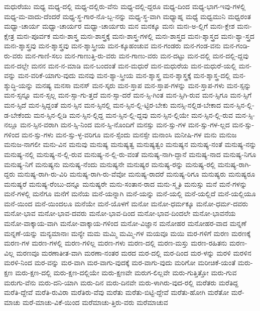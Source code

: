 {ಮಧುರೆಯು
ಮಧ್ಯ
ಮಧ್ಯ-ದಲ್ಲಿ
ಮಧ್ಯ-ದಲ್ಲಿರು-ವೆನು
ಮಧ್ಯ-ದಲ್ಲಿ-ದ್ದರೂ
ಮಧ್ಯ-ದಿಂದ
ಮಧ್ಯ-ಭಾಗ-ಇವು-ಗಳಲ್ಲಿ
ಮಧ್ಯ-ಮ-ವಾದು-ದೆಂದರೆ
ಮಧ್ಯ-ಸ್ಥ-ಗಾರ-ನೊ-ಬ್ಬ-ನನ್ನು
ಮಧ್ಯ-ಸ್ಥ-ವಾಗಿ
ಮಧ್ಯಾಹ್ನ
ಮಧ್ಯೆ
ಮಧ್ವಮುನಿ
ಮಧ್ವರಂತ
ಮಧ್ವಾ-ಚಾರ್ಯ
ಮಧ್ವಾ-ಚಾರ್ಯರ
ಮಧ್ವಾ-ಚಾರ್ಯರು
ಮನ
ಮನಕ್ಕೂ
ಮನಃ
ಮನಃ-ಅ-ಲ್ಲಿಗೆ
ಮನಃ-ಕ್ಲೇಶ
ಮನಃ-ಕ್ಷೇತ್ರ
ಮನಃ-ಪೂರ್ವಕ
ಮನಃ-ಶಾಸ್ತ್ರ
ಮನಃ-ಶಾಸ್ತ್ರಕ್ಕೆ
ಮನಃ-ಶಾಸ್ತ್ರ-ಗಳಲ್ಲಿ
ಮನಃ-ಶಾಸ್ತ್ರದ
ಮನಃ-ಶ್ಶಾಸ್ತ್ರದ
ಮನಃ-ಶ್ಯಾ-ಸ್ತ್ರದ
ಮನಃ-ಶ್ಶಾಸ್ತ್ರವು
ಮನ-ಶ್ಶಾಸ್ತ್ರವು
ಮನ-ಶ್ಶಾಸ್ತ್ರೀಯ
ಮನ-ಕ್ಕೂಹಂಚುವ
ಮನ-ಗಂಡರು
ಮನ-ಗಂಡ-ವನು
ಮನ-ಗಂಡಿ-ರು-ವರು
ಮನ-ಗಾಣಿ-ಸಲು
ಮನ-ಗಾಣುತ್ತಿ-ರು-ವರು
ಮನ-ಗಾಣು-ವರು
ಮನ-ದಟ್ಟು
ಮನ-ದಲ್ಲಿ
ಮನ-ದಲ್ಲಿ-ದ್ದವು
ಮನ-ದಲ್ಲೇ
ಮನನ
ಮನ-ನ-ಮಾಡಿ
ಮನ-ಬಂದಂತೆ
ಮನ-ಮಧುರೆ
ಮನ-ಮಧುರೆಯ
ಮನ-ಮಧುರೆ-ಯಲ್ಲಿ
ಮನ-ವನ್ನು
ಮನ-ವರಿಕೆ-ಯಾಗು-ವುದು
ಮನವು
ಮನ-ಶ್ಯಾ-ಸ್ತ್ರೀಯ
ಮನ-ಶ್ಶಾಸ್ತ್ರ
ಮನ-ಶ್ಶಾಸ್ತ್ರಕ್ಕೆ
ಮನ-ಶ್ಶಾಸ್ತ್ರ-ದಲ್ಲಿ
ಮನ-ಶ್ಶುದ್ಧಿ-ಯನ್ನು
ಮನಷ್ಯ
ಮನಸಾ
ಮನಸ್
ಮನ-ಸ್ಕರು
ಮನ-ಸ್ತಾಪ
ಮನ-ಸ್ತಾಪ-ಗಳನ್ನು
ಮನ-ಸ್ತಾಪ-ಗಳು
ಮನ-ಸ್ಸನ್ನು
ಮನ-ಸ್ಸನ್ನೂ
ಮನ-ಸ್ಸಲ್ಲ
ಮನ-ಸ್ಸಾ-ಗು-ತ್ತದೆ
ಮನ-ಸ್ಸಾ-ದರೆ
ಮನ-ಸ್ಸಿ-ಗಿಂತ
ಮನ-ಸ್ಸಿಗಿ-ರುವ
ಮನ-ಸ್ಸಿಗೂ
ಮನ-ಸ್ಸಿಗೆ
ಮನ-ಸ್ಸಿದೆ
ಮನ-ಸ್ಸಿದ್ದಂತೆ
ಮನ-ಸ್ಸಿನ
ಮನ-ಸ್ಸಿನಲ್ಲಿ
ಮನ-ಸ್ಸಿನ-ಲ್ಲಿ-ಟ್ಟಿರ-ಬೇಕು
ಮನಸ್ಸಿ-ನಲ್ಲಿಡ-ಬೇಕಾದ
ಮನ-ಸ್ಸಿನ-ಲ್ಲಿ-ಡ-ಬೇಕೆಂದು
ಮನ-ಸ್ಸಿನ-ಲ್ಲಿಡಿ
ಮನ-ಸ್ಸಿನ-ಲ್ಲಿದ್ದ
ಮನ-ಸ್ಸಿನ-ಲ್ಲಿ-ದ್ದವು
ಮನ-ಸ್ಸಿನ-ಲ್ಲಿಯೇ
ಮನ-ಸ್ಸಿನ-ಲ್ಲಿ-ರುವ
ಮನ-ಸ್ಸಿ-ನಲ್ಲೂ
ಮನ-ಸ್ಸಿನ-ವರಾಗಿ
ಮನ-ಸ್ಸಿ-ನಿಂದ
ಮನ-ಸ್ಸಿ-ನೊಂದಿಗೆ
ಮನಸ್ಸು
ಮನ-ಸ್ಸು-ಗಳ
ಮನ-ಸ್ಸು-ಗಳ-ಲ್ಲದ
ಮನ-ಸ್ಸು-ಗಳಿಂದ
ಮನ-ಸ್ಸು-ಗಳು
ಮನ-ಸ್ಸು-ಳ್ಳ-ವರಿಗೂ
ಮನ-ಸ್ಸೆಂದು
ಮನಸ್ಸೇ
ಮನಾಂಸಿ
ಮನೀಷಿ-ಗಳ
ಮನು
ಮನುಜ
ಮನುಜ-ನಾಗಲೀ
ಮನು-ವಿನ
ಮನುವು
ಮನುಷ್ಯ
ಮನುಷ್ಯತ್ವ
ಮನುಷ್ಯತ್ವಂ
ಮನುಷ್ಯನ
ಮನುಷ್ಯ-ನಂತೆ
ಮನುಷ್ಯ-ನನ್ನು
ಮನುಷ್ಯ-ನಲ್ಲಿ
ಮನುಷ್ಯ-ನ-ಲ್ಲಿ-ರುವ
ಮನುಷ್ಯ-ನ-ಲ್ಲಿ-ರು-ವಂತೆ
ಮನುಷ್ಯ-ನಾಗಿ-ದ್ದಾನೆ
ಮನುಷ್ಯ-ನಾದ
ಮನುಷ್ಯ-ನಿಗೂ
ಮನುಷ್ಯ-ನಿಗೆ
ಮನುಷ್ಯನು
ಮನುಷ್ಯ-ನೆಂದು
ಮನುಷ್ಯನೇ
ಮನುಷ್ಯರ
ಮನುಷ್ಯ-ರನ್ನು
ಮನುಷ್ಯ-ರಲ್ಲಿ
ಮನುಷ್ಯ-ರಾಗಿ-ದ್ದರು
ಮನುಷ್ಯ-ರಾಗಿ-ರು-ವಿರಿ
ಮನುಷ್ಯ-ರಾಗಿ-ರು-ವೆವೋ
ಮನುಷ್ಯ-ರಾದರೆ
ಮನುಷ್ಯ-ರಿಗೂ
ಮನುಷ್ಯರು
ಮನುಷ್ಯರೂ
ಮನುಷ್ಯರೆ
ಮನುಷ್ಯ-ರೆಂಬು-ದನ್ನೂ
ಮನುಷ್ಯರೇ
ಮನು-ಸಂತಾನ-ರಾದ
ಮನು-ಸ್ಮೃತಿ
ಮನುಸ್ಸು
ಮನೆ
ಮನೆ-ಗಳನ್ನು
ಮನೆ-ಗಳಲ್ಲಿ
ಮನೆಗೂ
ಮನೆಗೆ
ಮನೆಯ
ಮನೆ-ಯನ್ನಾಗಿ
ಮನೆ-ಯನ್ನು
ಮನೆ-ಯಲ್ಲಿ
ಮನೆ-ಯಲ್ಲಿದೆ
ಮನೆ-ಯಲ್ಲಿಯೂ
ಮನೆ-ಯಿಂದ
ಮನೆ-ಯಿಂದಲೂ
ಮನೆಯೇ
ಮನೆ-ಯೊಳಗೆ
ಮನೋ
ಮನೋ-ಧರ್ಮಕ್ಕೂ
ಮನೋ-ಧರ್ಮ-ದವರು
ಮನೋ-ಭಾವ
ಮನೋ-ಭಾವ-ದವರು
ಮನೋ-ಭಾವ-ದಿಂದ
ಮನೋ-ಭಾವ-ದಿಂದಲೇ
ಮನೋ-ಭಾವನೆಯ
ಮನೋ-ವಾಕ್ಕಾಯ-ವಾಗಿ
ಮನೋ-ವಾಕ್ಕಾಯ-ಗಳಿಂದ
ಮನೋ-ವಿಜ್ಞಾನ
ಮನೋಹರ
ಮನೋಹರ-ವಾದ
ಮನ್ನಣೆ
ಮನ್ನಣೆ-ಯನ್ನು
ಮನ್ಯಮಾನಾಃ
ಮನ್ಯೇ
ಮಮ
ಮಮ್ಮಿ
ಮಮ್ಮಿ-ಗಳ
ಮಯವೂ
ಮಯಿ
ಮರ-ಗಳಿಗೆ
ಮರಣ
ಮರಣಕ್ಕೆ
ಮರಣ-ಗಳ
ಮರಣ-ಗಳಲ್ಲಿ
ಮರಣ-ಗಳಿಲ್ಲ
ಮರಣ-ಗಳು
ಮರಣ-ದಲ್ಲಿ
ಮರಣ-ಮಸ್ತು
ಮರಣ-ರಹಿತನು
ಮರಣ-ವಿಲ್ಲ
ಮರಣವೂ
ಮರಣಾತೀತ-ವಾಗಿ
ಮರಣಾ-ನಂತರ
ಮರದ
ಮರ-ದಲ್ಲಿ
ಮರ-ದಿಂದ
ಮರ-ಳನ್ನು
ಮರಳಿ
ಮರಳಿನ
ಮರಳಿ-ನಿಂದ
ಮರ-ವನ್ನು
ಮರ-ವಾಗಿ
ಮರ-ವಾಗು-ವುದಕ್ಕೆ
ಮರ-ವಾಗು-ವುದು
ಮರಿಗೋ
ಮರೀಚಿಕೆ-ಯಂತೆ
ಮರು-ಕ್ಷಣ
ಮರು-ಕ್ಷಣ-ದಲ್ಲಿ
ಮರು-ಕ್ಷಣ-ದಲ್ಲಿಯೇ
ಮರು-ಕ್ಷಣವೇ
ಮರುಗ-ಲಿಲ್ಲವೇ
ಮರು-ಗುತ್ತಿತ್ತೋ
ಮರು-ಗುವ
ಮರುಗು-ವೆನು
ಮರು-ದನಿ-ಯಾಗಿ
ಮರು-ದಿನ
ಮರು-ದಿನವೇ
ಮರು-ಳಾಗಿರು-ವುದ-ರಲ್ಲಿ
ಮರೆತರು
ಮರೆತಿದ್ದ
ಮರೆತಿ-ದ್ದೇವೆ
ಮರೆತಿ-ರುವಿರಾ
ಮರೆತಿರು-ವೆವು
ಮರೆತು
ಮರೆತು-ಬಿಟ್ಟಿ-ದ್ದೇವೆ
ಮರೆತು-ಹೋಗಿ
ಮರೆತೋ
ಮರೆ-ಮಾಚು
ಮರೆ-ಮಾಚು-ವಿಕೆ-ಯಿಂದ
ಮರೆಮಾಚು-ತ್ತಿರು-ವರು
ಮರೆಮಾಚುವ
}
